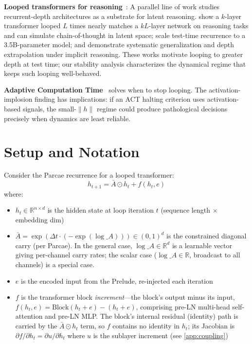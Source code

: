 \documentclass[11pt]{article}
\begin{document}
\textbf{Looped transformers for reasoning}~\citep{saunshi2025,geiping2025,kohli2026}: A parallel line of work studies recurrent-depth architectures as a substrate for latent reasoning. \citet{saunshi2025} show a $k$-layer transformer looped $L$ times nearly matches a $kL$-layer network on reasoning tasks and can simulate chain-of-thought in latent space; \citet{geiping2025} scale test-time recurrence to a 3.5B-parameter model; and \citet{kohli2026} demonstrate systematic generalization and depth extrapolation under implicit reasoning. These works motivate looping to greater depth at test time; our stability analysis characterizes the dynamical regime that keeps such looping well-behaved.

\textbf{Adaptive Computation Time}~\citep{graves2016} solves when to stop looping. The activation-implosion finding has implications: if an ACT halting criterion uses activation-based signals, the small-$\|h\|$ regime could produce pathological decisions precisely when dynamics are least reliable.


\section{Setup and Notation}
\label{sec:setup}

Consider the Parcae recurrence for a looped transformer:
\begin{equation}
h_{t+1} = \bar{A} \odot h_t + f(h_t, e)
\label{eq:recurrence}
\end{equation}
where:
\begin{itemize}
    \item $h_t \in \mathbb{R}^{n \times d}$ is the hidden state at loop iteration $t$ (sequence length $\times$ embedding dim)
    \item $\bar{A} = \exp(\Delta t \cdot (-\exp(\log\_A))) \in (0,1)^d$ is the constrained diagonal carry (per Parcae). In the general case, $\log\_A \in \mathbb{R}^d$ is a learnable vector giving per-channel carry rates; the scalar case ($\log\_A \in \mathbb{R}$, broadcast to all channels) is a special case.
    \item $e$ is the encoded input from the Prelude, re-injected each iteration
    \item $f$ is the transformer block \emph{increment}---the block's output minus its input, $f(h_t,e) = \text{Block}(h_t + e) - (h_t + e)$, comprising pre-LN multi-head self-attention and pre-LN MLP. The block's internal residual (identity) path is carried by the $\bar{A} \odot h_t$ term, so $f$ contains no identity in $h_t$; its Jacobian is $\partial f / \partial h_t = \partial u / \partial h_t$ where $u$ is the sublayer increment (see \cref{app:coupling})
\end{itemize}
\end{document}
